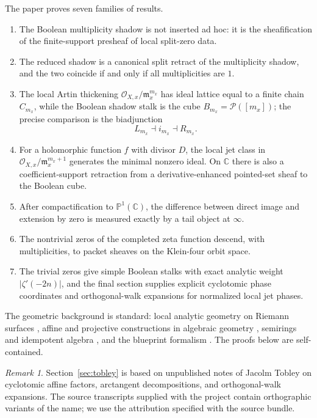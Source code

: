 \documentclass[11pt,a4paper]{article}
\theoremstyle{definition}
\theoremstyle{remark}
\newtheorem{remark}[theorem]{Remark}
\newcommand{\CC}{\mathbb C}
\newcommand{\PP}{\mathbb P}
\newcommand{\cO}{\mathcal O}
\newcommand{\cP}{\mathcal P}
\begin{document}
The paper proves seven families of results.

\begin{enumerate}[label=(\arabic*)]
\item The Boolean multiplicity shadow is not inserted ad hoc: it is the sheafification of the finite-support presheaf of local split-zero data.
\item The reduced shadow is a canonical split retract of the multiplicity shadow, and the two coincide if and only if all multiplicities are $1$.
\item The local Artin thickening $\cO_{X,x}/\mathfrak m_x^{m_x}$ has ideal lattice equal to a finite chain $C_{m_x}$, while the Boolean shadow stalk is the cube $B_{m_x}=\cP([m_x])$; the precise comparison is the biadjunction
\[
L_{m_x}\dashv i_{m_x}\dashv R_{m_x}.
\]
\item For a holomorphic function $f$ with divisor $D$, the local jet class in $\cO_{X,x}/\mathfrak m_x^{m_x+1}$ generates the minimal nonzero ideal.  On $\CC$ there is also a coefficient-support retraction from a derivative-enhanced pointed-set sheaf to the Boolean cube.
\item After compactification to $\PP^1(\CC)$, the difference between direct image and extension by zero is measured exactly by a tail object at $\infty$.
\item The nontrivial zeros of the completed zeta function descend, with multiplicities, to packet sheaves on the Klein-four orbit space.
\item The trivial zeros give simple Boolean stalks with exact analytic weight $|\zeta'(-2n)|$, and the final section supplies explicit cyclotomic phase coordinates and orthogonal-walk expansions for normalized local jet phases.
\end{enumerate}

The geometric background is standard: local analytic geometry on Riemann surfaces \cite{Lee}, affine and projective constructions in algebraic geometry \cite{GrothendieckEGAII,Vakil,OrecchiaChiantini}, semirings and idempotent algebra \cite{GaubertKatz,Gunawardena,DrosteKuichVogler}, and the blueprint formalism \cite{Lorscheid}.  The proofs below are self-contained.

\begin{remark}
Section~\ref{sec:tobley} is based on unpublished notes of Jacolm Tobley on cyclotomic affine factors, arctangent decompositions, and orthogonal-walk expansions.  The source transcripts supplied with the project contain orthographic variants of the name; we use the attribution specified with the source bundle.
\end{remark}
\end{document}
